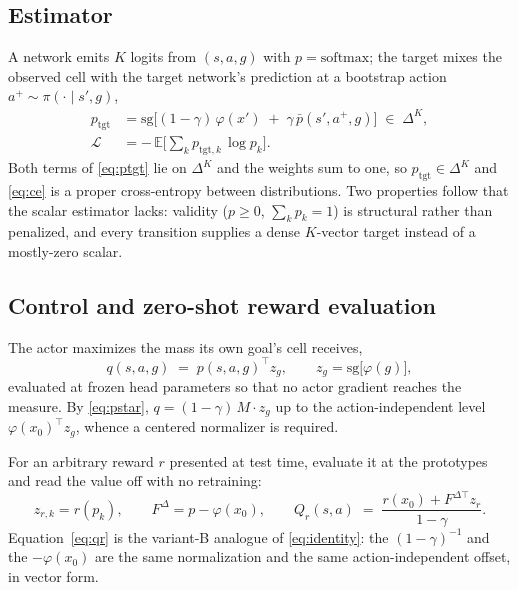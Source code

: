 \documentclass{article}
\providecommand{\E}{\mathbb{E}}
\newcommand{\sg}{\mathrm{sg}}
\newcommand{\simplex}{\Delta^{K}}
\begin{document}
\subsection{Estimator}

A network emits $K$ logits from $(s,a,g)$ with $p=\mathrm{softmax}$; the target
mixes the observed cell with the target network's prediction at a bootstrap
action $a^{+}\sim\pi(\cdot\mid s',g)$,
\begin{align}
p_{\mathrm{tgt}} &= \sg\big[(1-\gamma)\,\varphi(x') \;+\; \gamma\,\bar p(s',a^{+},g)\big] \;\in\;\simplex,
\label{eq:ptgt}\\
\mathcal{L} &= -\,\E\Big[\textstyle\sum_{k} p_{\mathrm{tgt},k}\,\log p_k\Big].
\label{eq:ce}
\end{align}
Both terms of \eqref{eq:ptgt} lie on $\simplex$ and the weights sum to one, so
$p_{\mathrm{tgt}}\in\simplex$ and \eqref{eq:ce} is a proper cross-entropy between
distributions. Two properties follow that the scalar estimator lacks: validity
($p\ge0$, $\sum_k p_k=1$) is structural rather than penalized, and every
transition supplies a dense $K$-vector target instead of a mostly-zero scalar.

\subsection{Control and zero-shot reward evaluation}

The actor maximizes the mass its own goal's cell receives,
\begin{equation}
q(s,a,g) \;=\; p(s,a,g)^{\top} z_g,
\qquad z_g = \sg\big[\varphi(g)\big],
\label{eq:actor}
\end{equation}
evaluated at frozen head parameters so that no actor gradient reaches the
measure. By \eqref{eq:pstar}, $q=(1-\gamma)\,M\cdot z_g$ up to the
action-independent level $\varphi(x_0)^{\top}z_g$, whence a centered normalizer is
required.

For an arbitrary reward $r$ presented at test time, evaluate it at the prototypes
and read the value off with no retraining:
\begin{equation}
z_{r,k} = r(p_k),
\qquad
F^{\Delta} = p - \varphi(x_0),
\qquad
Q_r(s,a) \;=\; \frac{r(x_0) + F^{\Delta\top} z_r}{1-\gamma}.
\label{eq:qr}
\end{equation}
Equation~\eqref{eq:qr} is the variant-B analogue of \eqref{eq:identity}: the
$(1-\gamma)^{-1}$ and the $-\varphi(x_0)$ are the same normalization and the same
action-independent offset, in vector form.
\end{document}
